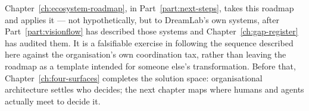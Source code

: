 Chapter~\ref{ch:ecosystem-roadmap}, in Part~\ref{part:next-steps}, takes this roadmap and applies it --- not hypothetically, but to DreamLab's own systems, after Part~\ref{part:visionflow} has described those systems and Chapter~\ref{ch:gap-register} has audited them. It is a falsifiable exercise in following the sequence described here against the organisation's own coordination tax, rather than leaving the roadmap as a template intended for someone else's transformation. Before that, Chapter~\ref{ch:four-surfaces} completes the solution space: organisational architecture settles who decides; the next chapter maps where humans and agents actually meet to decide it.

